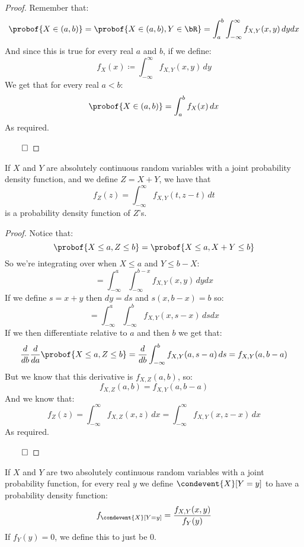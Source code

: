 \begin{proof}

	Remember that:
	\[ \probof{X\in(a,b)} = \probof{X\in(a,b), Y\in\bR} = \int_a^b\int_{-\infty}^\infty f_{X,Y}(x,y)\,dy dx \]
	And since this is true for every real $a$ and $b$, if we define:
	\[ f_X(x)\coloneqq\int_{-\infty}^\infty f_{X,Y}(x,y)\,dy \]
	We get that for every real $a<b$:
	\[ \probof{X\in(a,b)} = \int_a^b f_X(x)\,dx \]
	As required.

	\hfill$\qed$

\end{proof}

\begin{thrm*}

	If $X$ and $Y$ are absolutely continuous random variables with a joint probability density function, and we define $Z=X+Y$,
	we have that
	\[ f_Z(z) = \int_{-\infty}^\infty f_{X,Y}(t, z-t)\,dt \]
	is a probability density function of $Z$'s.

\end{thrm*}

\begin{proof}

	Notice that:
	\[ \probof{X\leq a, Z\leq b} = \probof{X\leq a, X+Y\leq b} \]
	So we're integrating over when $X\leq a$ and $Y\leq b-X$:
	\[ = \int_{-\infty}^a\int_{-\infty}^{b-x} f_{X,Y}(x,y)\,dy dx \]
	If we define $s=x+y$ then $dy=ds$ and $s(x,b-x)=b$ so:
	\[ = \int_{-\infty}^a\int_{-\infty}^b f_{X,Y}(x,s-x)\,ds dx \]
	If we then differentiate relative to $a$ and then $b$ we get that:
	\[ \frac{d}{db}\frac{d}{da}\probof{X\leq a, Z\leq b} = \frac{d}{db}\int_{-\infty}^b f_{X,Y}(a,s-a)\,ds = f_{X,Y}(a,b-a) \]
	But we know that this derivative is $f_{X,Z}(a,b)$, so:
	\[ f_{X,Z}(a,b) = f_{X,Y}(a,b-a) \]
	And we know that:
	\[ f_Z(z) = \int_{-\infty}^\infty f_{X,Z}(x,z)\,dx = \int_{-\infty}^\infty f_{X,Y}(x,z-x)\,dx \]
	As required.

	\hfill$\qed$

\end{proof}

\begin{defn*}

	If $X$ and $Y$ are two absolutely continuous random variables with a joint probability function, for every real $y$
	we define $\condevent{X}[Y=y]$ to have a probability density function:
	\[ f_{\condevent{X}[Y=y]} = \frac{f_{X,Y}(x,y)}{f_Y(y)} \]
	If $f_Y(y)=0$, we define this to just be $0$.

\end{defn*}

